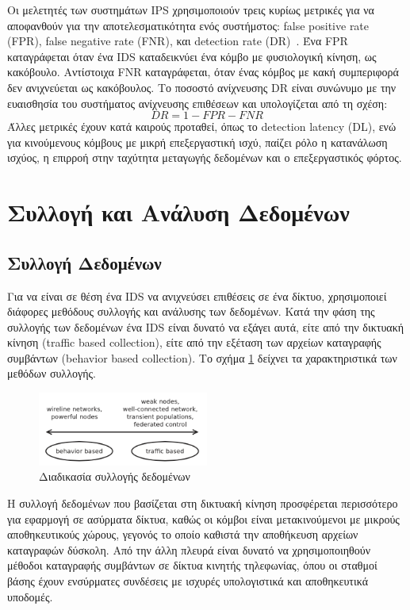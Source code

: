 \documentclass[12pt]{report}
\begin{document}
Οι μελετητές των συστημάτων \textlatin{IPS} χρησιμοποιούν τρεις κυρίως μετρικές για να αποφανθούν για την αποτελεσματικότητα ενός συστήμστος: \textlatin{false positive rate (FPR), false negative rate (FNR)}, και \textlatin{detection rate (DR)}~\cite{paper:12}. Ένα \textlatin{FPR} καταγράφεται όταν ένα \textlatin{IDS} καταδεικνύει ένα κόμβο με φυσιολογική κίνηση, ως κακόβουλο. Αντίστοιχα \textlatin{FNR} καταγράφεται, όταν ένας κόμβος με κακή συμπεριφορά δεν ανιχνεύεται ως κακόβουλος. Το ποσοστό ανίχνευσης \textlatin{DR} είναι συνώνυμο με την ευαισθησία του συστήματος ανίχνευσης επιθέσεων και υπολογίζεται από τη σχέση:
\[ DR = 1 - FPR - FNR \]
Άλλες μετρικές έχουν κατά καιρούς προταθεί, όπως το \textlatin{detection latency (DL)}, ενώ για κινούμενους κόμβους με μικρή επεξεργαστική ισχύ, παίζει ρόλο η κατανάλωση ισχύος, η επιρροή στην ταχύτητα μεταγωγής δεδομένων και ο επεξεργαστικός φόρτος.

\section{Συλλογή και Ανάλυση Δεδομένων}
\subsection{Συλλογή Δεδομένων}
Για να είναι σε θέση ένα \textlatin{IDS} να ανιχνεύσει επιθέσεις σε ένα δίκτυο, χρησιμοποιεί διάφορες μεθόδους συλλογής και ανάλυσης των δεδομένων. Κατά την φάση της συλλογής των δεδομένων ένα \textlatin{IDS} είναι δυνατό να εξάγει αυτά, είτε από την δικτυακή κίνηση (\textlatin{traffic based collection}), είτε από την εξέταση των αρχείων καταγραφής συμβάντων (\textlatin{behavior based collection}). Το σχήμα \ref{fig:coll-appr} δείχνει τα χαρακτηριστικά των μεθόδων συλλογής.
\begin{figure}[ht]
\centering
\includegraphics[width=0.5\textwidth]{coll-appr}
\caption{Διαδικασία συλλογής δεδομένων}
\label{fig:coll-appr}
\end{figure}

Η συλλογή δεδομένων που βασίζεται στη δικτυακή κίνηση προσφέρεται περισσότερο για εφαρμογή σε ασύρματα δίκτυα, καθώς οι κόμβοι είναι μετακινούμενοι με μικρούς αποθηκευτικούς χώρους, γεγονός το οποίο καθιστά την αποθήκευση αρχείων καταγραφών δύσκολη. Από την άλλη πλευρά είναι δυνατό να χρησιμοποιηθούν μέθοδοι καταγραφής συμβάντων σε δίκτυα κινητής τηλεφωνίας, όπου οι σταθμοί βάσης έχουν ενσύρματες συνδέσεις με ισχυρές υπολογιστικά και αποθηκευτικά υποδομές.
\end{document}

